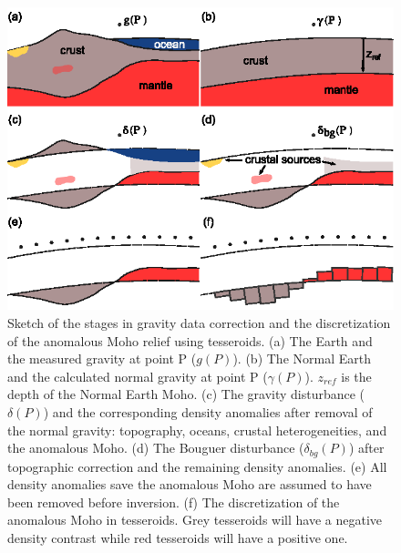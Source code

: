\documentclass[extra,mreferee]{gji}
\begin{document}
\begin{figure}
    \centering
    \includegraphics{figures/problem-concept}
    \caption{
        Sketch of the stages in gravity data correction and
        the discretization of the anomalous Moho relief using tesseroids.
        (a) The Earth and the measured gravity at point P ($g(P)$).
        (b) The Normal Earth and the calculated normal gravity at point P
        ($\gamma(P)$). $z_{ref}$ is the depth of the Normal Earth Moho.
        (c) The gravity disturbance ($\delta(P)$) and
        the corresponding density anomalies after removal of the normal gravity:
        topography, oceans, crustal heterogeneities, and the anomalous Moho.
        (d) The Bouguer disturbance ($\delta_{bg}(P)$) after topographic
        correction and the remaining density anomalies.
        (e) All density anomalies save the anomalous Moho are assumed to have
        been removed before inversion.
        (f) The discretization of the anomalous Moho in tesseroids. Grey
        tesseroids will have a negative density contrast while red tesseroids
        will have a positive one.
    }
    \label{fig:anomalysketch}
\end{figure}
\end{document}
